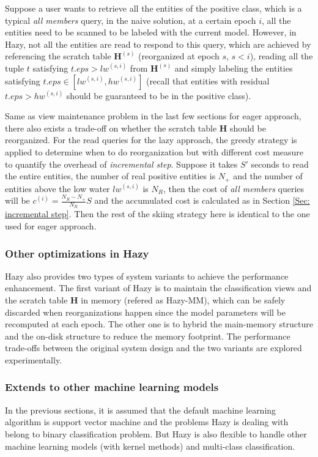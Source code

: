 Suppose a user wants to retrieve all the entities of the positive class, which is a typical {\em all members} query, in the naive solution, at a certain epoch $i$, all the entities need to be scanned to be labeled with the current model. However, in Hazy, not all the entities are read to respond to this query, which are achieved by referencing the scratch table $\textbf{H}^{(s)}$ (reorganized at epoch $s$, $s < i$), reading all the tuple $t$ satisfying $t.eps > lw^{(s,i)}$ from $\textbf{H}^{(s)}$ and simply labeling the entities satisfying $t.eps \in [lw^{(s,i)}, hw^{(s,i)}]$ (recall that entities with residual $t.eps > hw^{(s,i)}$ should be guaranteed to be in the positive class). 

Same as view maintenance problem in the last few sections for eager approach, there also exists a trade-off on whether the scratch table $\textbf{H}$ should be reorganized. For the read queries for the lazy approach, the greedy strategy is applied to determine when to do reorganization but with different cost measure to quantify the overhead of {\em incremental step}. Suppose it takes $S'$ seconds to read the entire entities, the number of real positive entities is $N_{+}$ and the number of entities above the low water $lw^{(s,i)}$ is $N_{R}$, then the cost of {\em all members} queries will be $c^{(i)} = \frac{N_{R}-N_{+}}{N_{R}}S$ and the accumulated cost is calculated as in Section \ref{Sec: incremental step}. Then the rest of the skiing strategy here is identical to the one used for eager approach.


\subsubsection{Other optimizations in Hazy}
Hazy also provides two types of system variants to achieve the performance enhancement. The first variant of Hazy is to maintain the classification views and the scratch table $\textbf{H}$ in memory (refered as Hazy-MM), which can be safely discarded when reorganizations happen since the model parameters will be recomputed at each epoch. The other one is to hybrid the main-memory structure and the on-disk structure to reduce the memory footprint. The performance trade-offs between the original system design and the two variants are explored experimentally.

\subsubsection{Extends to other machine learning models}
In the previous sections, it is assumed that the default machine learning algorithm is support vector machine and the problems Hazy is dealing with belong to binary classification problem. But Hazy is also flexible to handle other machine learning models (with kernel methods) and multi-class classification.

